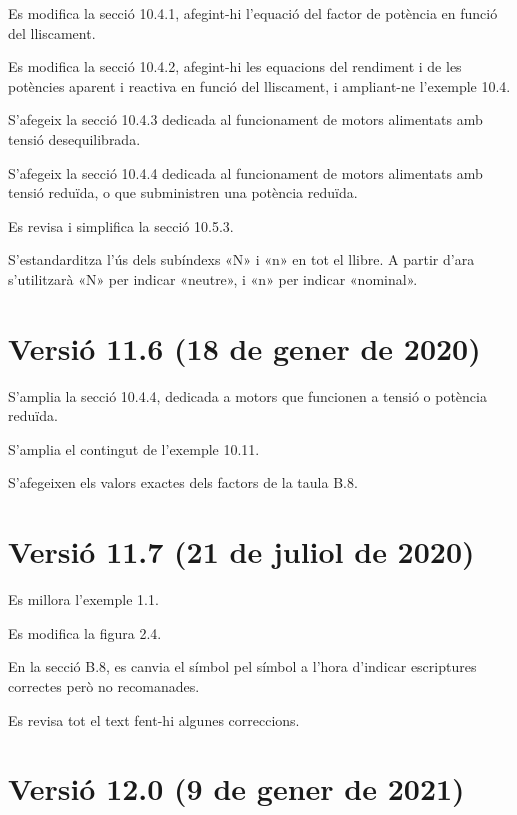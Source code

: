 Es modifica la secció 10.4.1, afegint-hi l'equació del factor de potència en funció del lliscament.

Es modifica la secció 10.4.2, afegint-hi les equacions del rendiment i de les potències aparent i reactiva en funció del lliscament, i ampliant-ne l'exemple 10.4.

S'afegeix la secció 10.4.3 dedicada al funcionament de motors alimentats amb tensió desequilibrada.

S'afegeix la secció 10.4.4 dedicada al funcionament de motors alimentats amb tensió reduïda, o que subministren una potència reduïda.

Es revisa i simplifica la secció 10.5.3.

S'estandarditza l'ús dels subíndexs «N» i  «n» en tot el llibre. A partir d'ara s'utilitzarà  «N» per indicar  «neutre», i  «n» per indicar   «nominal».


\section*{Versió 11.6 (18 de gener de 2020)}

S'amplia la secció 10.4.4, dedicada a motors que funcionen a tensió o potència reduïda.

S'amplia el contingut de l'exemple 10.11.

S'afegeixen els valors exactes dels factors de la taula B.8.


\section*{Versió 11.7 (21 de juliol de 2020)}

Es millora l'exemple 1.1.

Es modifica la figura 2.4.

En la secció B.8, es canvia el símbol \textcolor{Blue}\faQuestionCircle{} pel símbol \textcolor{Blue}\faExclamationTriangle{} a l'hora d'indicar escriptures correctes però no recomanades.

Es revisa tot el text fent-hi algunes correccions.


\section*{Versió 12.0 (9 de gener de 2021)}

